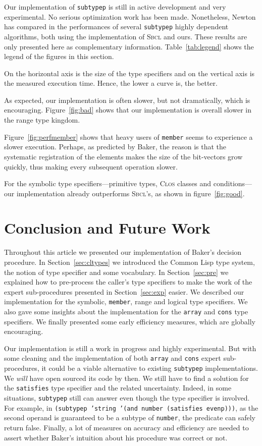 \documentclass[format=sigconf]{acmart}
\newcommand\code[2][\small]{\sloppy\texttt{#1#2}}
\theoremstyle{definition}
\newcommand\sbcl{\textsc{Sbcl}}
\begin{document}
Our implementation of \code{subtypep} is still in active development and very
experimental. No serious optimization work has been made. Nonetheless, Newton
has compared in \cite{newton.18.phd} the performances of several \code{subtypep}
highly dependent algorithms, both using the implementation of \sbcl{} and ours.
These results are only presented here as complementary information.
Table~\ref{tab:legend} shows the legend of the figures in this section.

On the horizontal axis is the size of the type specifiers and on the vertical
axis is the measured execution time. Hence, the lower a curve is, the better.

As expected, our implementation is often slower, but not dramatically, which is
encouraging. Figure~\ref{fig:bad} shows that our implementation is overall
slower in the range type kingdom.

Figure~\ref{fig:perfmember} shows that heavy users of \code{member} seems to
experience a slower execution. Perhaps, as predicted by Baker, the reason is
that the systematic registration of the elements makes the size of the
bit-vectors grow quickly, thus making every subsequent operation slower.

For the symbolic type specifiers---primitive types, \textsc{Clos} classes and
conditions---our implementation already outperforms \sbcl's, as shown in
figure~\ref{fig:good}.

\section{Conclusion and Future Work}
Throughout this article we presented our implementation of Baker's decision
procedure. In Section~\ref{sec:cltypes} we introduced the Common Lisp type
system, the notion of type specifier and some vocabulary. In
Section~\ref{sec:pre} we explained how to pre-process the caller's type
specifiers to make the work of the expert sub-procedures presented in
Section~\ref{sec:exp} easier. We described our implementation for the symbolic,
\code{member}, range and logical type specifiers. We also gave some insights
about the implementation for the \code{array} and \code{cons} type specifiers.
We finally presented some early efficiency measures, which are globally
encouraging.

Our implementation is still a work in progress and highly experimental. But with
some cleaning and the implementation of both \code{array} and \code{cons} expert
sub-procedures, it could be a viable alternative to existing \code{subtypep}
implementations. We \emph{will} have open sourced its code by then.
We still have to find a solution for the \code{satisfies} type specifier and the
related uncertainty. Indeed, in some situations, \code{subtypep} still can
answer even though the type specifier is involved. For example, in
\code{(subtypep 'string '(and number (satisfies evenp)))}, as the second operand
is guaranteed to be a subtype of \code{number}, the predicate can safely return
false. Finally, a lot of measures on accuracy and efficiency are needed to
assert whether Baker's intuition about his procedure was correct or not.
\end{document}
